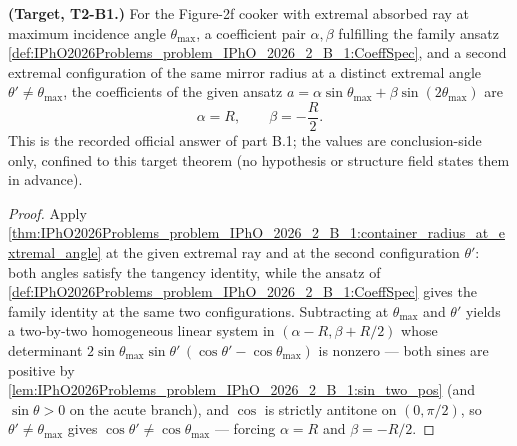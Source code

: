 \begin{theorem}
\label{thm:IPhO2026Problems_problem_IPhO_2026_2_B_1:alpha_beta_in_terms_of_R}
\textbf{(Target, T2-B1.)}  For the Figure-2f cooker with extremal absorbed
ray at maximum incidence angle $\theta_{\max}$, a coefficient pair
$\alpha, \beta$ fulfilling the family ansatz
\cref{def:IPhO2026Problems_problem_IPhO_2026_2_B_1:CoeffSpec}, and a
second extremal configuration of the same mirror radius at a distinct
extremal angle $\theta' \neq \theta_{\max}$, the coefficients of the given
ansatz $a = \alpha \sin\theta_{\max} + \beta \sin(2\theta_{\max})$ are
\[
\alpha = R, \qquad \beta = -\frac{R}{2} .
\]
This is the recorded official answer of part B.1; the values are
conclusion-side only, confined to this target theorem (no hypothesis or
structure field states them in advance).
\end{theorem}
\begin{proof}
Apply
\cref{thm:IPhO2026Problems_problem_IPhO_2026_2_B_1:container_radius_at_extremal_angle}
at the given extremal ray and at the second configuration
$\theta'$: both angles satisfy the tangency identity, while the ansatz of
\cref{def:IPhO2026Problems_problem_IPhO_2026_2_B_1:CoeffSpec} gives the
family identity at the same two configurations.  Subtracting at
$\theta_{\max}$ and $\theta'$ yields a two-by-two homogeneous linear
system in $(\alpha - R, \beta + R/2)$ whose determinant
$2\sin\theta_{\max}\sin\theta'\,(\cos\theta' - \cos\theta_{\max})$ is
nonzero --- both sines are positive by
\cref{lem:IPhO2026Problems_problem_IPhO_2026_2_B_1:sin_two_pos} (and
$\sin\theta > 0$ on the acute branch), and $\cos$ is strictly
antitone on $(0, \pi/2)$, so $\theta' \neq \theta_{\max}$ gives
$\cos\theta' \neq \cos\theta_{\max}$ --- forcing $\alpha = R$ and
$\beta = -R/2$.
\end{proof}
